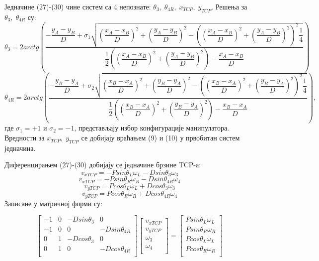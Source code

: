 \documentclass[12pt]{article}
\begin{document}
Једначине (27)-(30) чине систем са 4 непознате: $\theta_3,\;\theta_{4R},\;x_{TCP},\;y_{TCP}$. Решења за $\theta_3,\;\theta_{4R}$ су:
\begin{equation}
    \theta_3 = 2arctg\left(\dfrac{-\dfrac{y_A - y_B}{D} + \sigma_1\sqrt{\left(\dfrac{x_A-x_B}{D}\right)^2+\left(\dfrac{y_A-y_B}{D}\right)^2-\left(\left(\dfrac{x_A-x_B}{D}\right)^2+\left(\dfrac{y_A-y_B}{D}\right)^2\right)^2\dfrac{1}{4}}}{\dfrac{1}{2}\left(\left(\dfrac{x_A-x_B}{D}\right)^2+\left(\dfrac{y_A-y_B}{D}\right)^2\right)-\dfrac{x_A-x_B}{D}}\right)
\end{equation}
\begin{equation}
    \theta_{4R} = 2arctg\left(\dfrac{-\dfrac{y_B - y_A}{D} + \sigma_2\sqrt{\left(\dfrac{x_B-x_A}{D}\right)^2+\left(\dfrac{y_B-y_A}{D}\right)^2-\left(\left(\dfrac{x_B-x_A}{D}\right)^2+\left(\dfrac{y_B-y_A}{D}\right)^2\right)^2\dfrac{1}{4}}}{\dfrac{1}{2}\left(\left(\dfrac{x_B-x_A}{D}\right)^2+\left(\dfrac{y_B-y_A}{D}\right)^2\right)-\dfrac{x_B-x_A}{D}}\right),
\end{equation}
где $\sigma_1=+1$ и $\sigma_2=-1$, представљају избор конфигурације манипулатора. Вредности за $x_{TCP},\;y_{TCP}$ се добијају враћањем (9) и (10) у првобитан систем једначина.

Диференцирањем (27)-(30) добијају се једначине брзине TCP-а:
\begin{equation}
    v_{xTCP} = -Psin\theta_L\omega_L - Dsin\theta_3\omega_3
\end{equation}
\begin{equation}
    v_{xTCP} = -Psin\theta_R\omega_R - Dsin\theta_{4R}\omega_4
\end{equation}
\begin{equation}
    v_{yTCP} = Pcos\theta_L\omega_L + Dcos\theta_3\omega_3
\end{equation}
\begin{equation}
    v_{yTCP} = Pcos\theta_R\omega_R + Dcos\theta_{4R}\omega_4
\end{equation}
Записане у матричној форми су:

\begin{equation}
\begin{bmatrix}
-1 & 0 & -Dsin\theta_3 & 0\\
-1 & 0 & 0 & -Dsin\theta_{4R}\\
0 & 1 & -Dcos\theta_3 & 0\\
0 & 1 & 0 & -Dcos\theta_{4R}\\
\end{bmatrix}
\begin{bmatrix}
v_{xTCP}\\
v_{yTCP}\\
\omega_3\\
\omega_4\\
\end{bmatrix}
=
\begin{bmatrix}
Psin\theta_L\omega_L\\
Psin\theta_R\omega_R\\
Pcos\theta_L\omega_L\\
Pcos\theta_R\omega_R\\
\end{bmatrix}
\end{equation}
\end{document}
